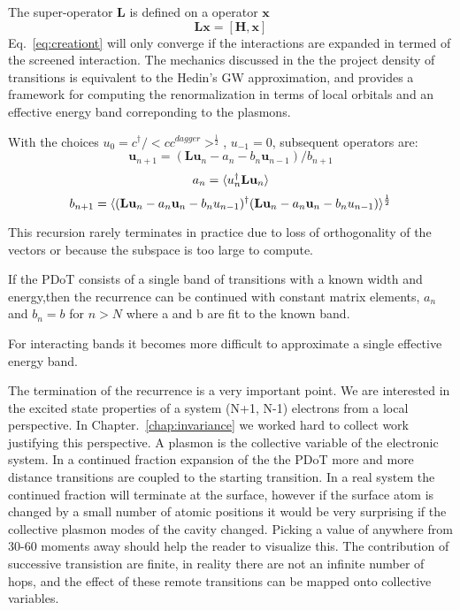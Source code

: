 The super-operator $\mathbf{L}$ is defined on a operator $\mathbf{x}$
%
\begin{equation}
\mathbf{L} \mathbf{x} = [\mathbf{H}, \mathbf{x}]
\end{equation}
%
Eq.~\ref{eq:creationt} will only converge if the interactions are expanded in termed
of the screened interaction. The mechanics discussed in the the project density of 
transitions is equivalent to the Hedin's GW approximation, and provides a framework
for computing the renormalization in terms of local orbitals and an 
effective energy band correponding to the plasmons.

With the choices $u_{0}=c^{\dagger}/<c c^{dagger}>^{\frac{1}{2}}$, $u_{-1}=0$,
subsequent operators are:
%
\begin{equation}
\label{eq:pdotvectors}
\mathbf{u}_{n+1} = (\mathbf{L} \mathbf{u}_{n} - a_{n}-b_{n}\mathbf{u}_{n-1})/b_{n+1}
\end{equation}
%
\begin{equation}
a_{n} = \langle u^{\dagger}_{n} \mathbf{L} \mathbf{u}_{n} \rangle
\end{equation}
%
\begin{equation}
b_{n+1} = \langle 
(\mathbf{L} \mathbf{u}_{n} - a_{n} \mathbf{u}_{n} - b_{n}u_{n-1})^{\dagger} 
(\mathbf{L} \mathbf{u}_{n} - a_{n} \mathbf{u}_{n} - b_{n}u_{n-1})
\rangle^{\frac{1}{2}}
\end{equation}
%

This recursion rarely terminates in practice due to loss of orthogonality of
the vectors or because the subspace is too large to compute.

If the PDoT consists of a single band of transitions with a known width 
and energy,then the recurrence can be continued with constant matrix elements, $a_{n}$ and $b_{n}=b$
for $n>N$ where a and b are fit to the known band. 

For interacting bands it becomes more difficult to approximate a 
single effective energy band.

The termination of the recurrence is a very important point. 
We are interested in the excited state properties of a system (N+1, N-1) electrons
from a local perspective. In Chapter.~\ref{chap:invariance} we worked hard to collect work
justifying this perspective. A plasmon is the collective variable of the electronic system.
In a continued fraction expansion of the the PDoT more and more distance transitions are coupled
to the starting transition. In a real system the continued fraction will terminate at the surface,
however if the surface atom is changed by a small number of atomic positions it would
be very surprising if the collective plasmon modes of the cavity changed. 
Picking a value of anywhere from 30-60 moments away should help the reader to visualize this.
The contribution of successive transistion are finite, in reality there are not an infinite number
of hops, and the effect of these remote transitions can be mapped onto collective variables.

